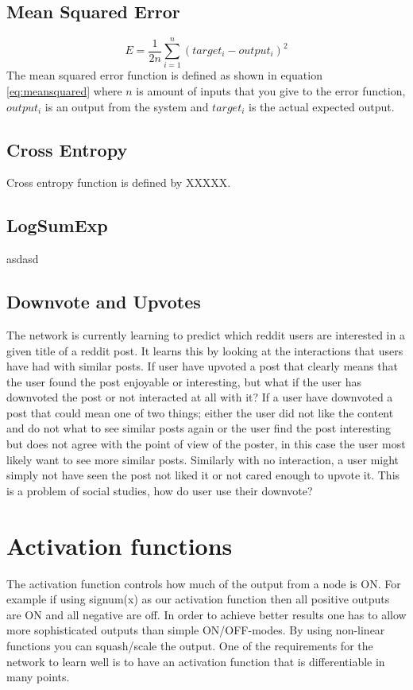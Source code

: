 \subsection{Mean Squared Error}
\begin{equation}\label{eq:meansquared}
    E=\frac{1}{2n}\sum_{i=1}^{n} (target_i - output_i)^2
\end{equation}
The mean squared error function is defined as shown in equation \ref{eq:meansquared} where $n$ is amount of inputs that you give to the error function, $output_i$ is an output from the system and $target_i$ is the actual expected output.

\subsection{Cross Entropy}
Cross entropy function is defined by XXXXX. 

\subsection{LogSumExp}
asdasd

\subsection{Downvote and Upvotes} %
The network is currently learning to predict which reddit users are interested in a given title of a reddit post. It learns this by looking at the interactions that users have had with similar posts. If user have upvoted a post that clearly means that the user found the post enjoyable or interesting, but what if the user has downvoted the post or not interacted at all with it? If a user have downvoted a post that could mean one of two things; either the user did not like the content and do not what to see similar posts again or the user find the post interesting but does not agree with the point of view of the poster, in this case the user most likely want to see more similar posts. Similarly with no interaction, a user might simply not have seen the post not liked it or not cared enough to upvote it. This is a problem of social studies, how do user use their downvote?

\section{Activation functions}
The activation function controls how much of the output from a node is ON. For example if using signum(x) as our activation function then all positive outputs are ON and all negative are off. In order to achieve better results one has to allow more sophisticated outputs than simple ON/OFF-modes. By using non-linear functions you can squash/scale the output. One of the requirements for the network to learn well is to have an activation function that is differentiable in many points.

